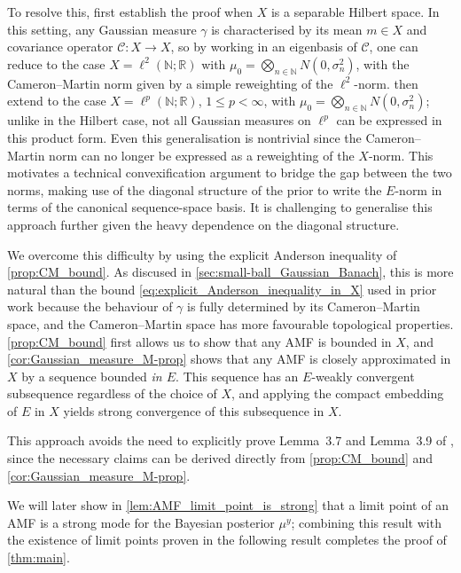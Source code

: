 \documentclass[11pt]{article}
\newcommand*{\Naturals}{\mathbb{N}}
\newcommand*{\Reals}{\mathbb{R}}
\renewcommand*{\leq}{\leqslant}
\theoremstyle{plain}
\theoremstyle{definition}
\numberwithin{equation}{section}
\numberwithin{figure}{section}
\numberwithin{table}{section}
\begin{document}
To resolve this, \citet{KlebanovWacker2022} first establish the proof when $X$ is a separable Hilbert space. 
In this setting, any Gaussian measure $\gamma$ is characterised by its mean $m \in X$ and covariance operator $\mathcal{C} \colon X \to X$, so by working in an eigenbasis of $\mathcal{C}$, one can reduce to the case $X = \ell^{2}(\Naturals; \Reals)$ with $\mu_{0} = \bigotimes_{n \in \Naturals} N(0, \sigma_{n}^{2})$, with the Cameron--Martin norm given by a simple reweighting of the $\ell^{2}$-norm.
\citet{KlebanovWacker2022} then extend to the case $X = \ell^{p}(\Naturals; \Reals)$, $1 \leq p < \infty$, with $\mu_{0} = \bigotimes_{n \in \Naturals} N(0, \sigma_{n}^{2})$;
unlike in the Hilbert case, not all Gaussian measures on $\ell^{p}$ can be expressed in this product form.
Even this generalisation is nontrivial since the Cameron--Martin norm can no longer be expressed as a reweighting of the $X$-norm.
This motivates a technical convexification argument to bridge the gap between the two norms, making use of the diagonal structure of the prior to write the $E$-norm in terms of the canonical sequence-space basis.
It is challenging to generalise this approach further given the heavy dependence on the diagonal structure.

We overcome this difficulty by using the explicit Anderson inequality of \cref{prop:CM_bound}.
As discused in \cref{sec:small-ball_Gaussian_Banach}, this is more natural than the bound \eqref{eq:explicit_Anderson_inequality_in_X} used in prior work because the behaviour of $\gamma$ is fully determined by its Cameron--Martin space, and the Cameron--Martin space has more favourable topological properties.
\cref{prop:CM_bound} first allows us to show that any AMF is bounded in $X$, and \cref{cor:Gaussian_measure_M-prop} shows that any AMF is closely approximated in $X$ by a sequence bounded \emph{in $E$}.
This sequence has an $E$-weakly convergent subsequence regardless of the choice of $X$, and applying the compact embedding of $E$ in $X$ yields strong convergence of this subsequence in $X$.

This approach avoids the need to explicitly prove Lemma~3.7 and Lemma~3.9 of \citet{DashtiLawStuartVoss2013}, since the necessary claims can be derived directly from \cref{prop:CM_bound} and \cref{cor:Gaussian_measure_M-prop}. 

We will later show in \cref{lem:AMF_limit_point_is_strong} that a limit point of an AMF is a strong mode for the Bayesian posterior $\mu^{y}$;
combining this result with the existence of limit points proven in the following result completes the proof of \cref{thm:main}.
\end{document}
